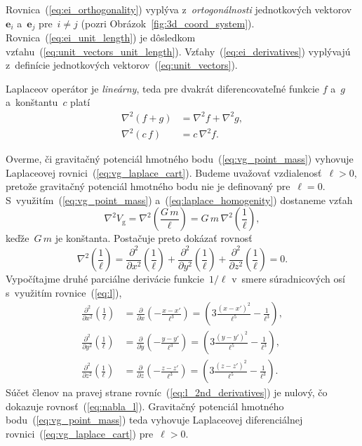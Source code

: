 \documentclass[a4paper, 12pt]{book}
\newcommand{\gidx}{\mathrm g}
\let\vec\mathbf
\begin{document}
%
Rovnica~(\ref{eq:ei_orthogonality}) vyplýva z~\emph{ortogonálnosti} 
jednotkových vektorov~$\vec e_i$ a~$\vec e_j$ pre~$i \neq j$ (pozri 
Obrázok~\ref{fig:3d_coord_system}).  Rovnica~(\ref{eq:ei_unit_length}) je 
dôsledkom vzťahu~(\ref{eq:unit_vectors_unit_length}).  
Vzťahy~(\ref{eq:ei_derivatives}) vyplývajú z~definície jednotkových 
vektorov~(\ref{eq:unit_vectors}).

Laplaceov operátor je \emph{lineárny}, teda pre dvakrát diferencovateľné 
funkcie $f$ a~$g$ a~konštantu~$c$ platí
%
\begin{align}
\label{eq:laplace_additivity}
\nabla^2 \left(f + g \right) &= \nabla^2 f + \nabla^2 g{,}\\
%
\label{eq:laplace_homogenity}
\nabla^2 (c \, f) &= c \, \nabla^2 f{.}
\end{align}

Overme, či gravitačný potenciál hmotného bodu~(\ref{eq:vg_point_mass}) vyhovuje 
Laplaceovej rovnici~(\ref{eq:vg_laplace_cart}).  Budeme uvažovať 
vzdialenosť~$\ell > 0$, pretože gravitačný potenciál hmotného bodu nie je 
definovaný pre~$\ell = 0$.  S~využitím~(\ref{eq:vg_point_mass}) 
a~(\ref{eq:laplace_homogenity}) dostaneme vzťah
%
\begin{equation}
\nabla^2 V_\gidx = \nabla^2 \left( \frac{G \, m}{\ell} \right) = G \, m \, 
\nabla^2 \left( \frac{1}{\ell} \right){,}
\end{equation}
%
keďže~$G \, m$ je konštanta.  Postačuje preto dokázať rovnosť
%
\begin{equation}
\label{eq:nabla_l}
\nabla^2 \left( \frac{1}{\ell} \right) = \frac{\partial^2}{\partial x^2}\left( 
\frac{1}{\ell} \right) + \frac{\partial^2}{\partial y^2}\left( \frac{1}{\ell} 
\right) + \frac{\partial^2}{\partial z^2}\left( \frac{1}{\ell} \right) = 0{.}
\end{equation}
%
Vypočítajme druhé parciálne derivácie funkcie~$1 \slash \ell$ v~smere 
súradnicových osí s~využitím rovnice~(\ref{eq:l}),
%
\begin{equation}
\label{eq:l_2nd_derivatives}
\begin{split}
\frac{\partial^2}{\partial x^2} \left( \frac{1}{\ell} \right) &=
\frac{\partial}{\partial x} \left( -\frac{x - x'}{\ell^3} \right) = \left(3
\frac{(x - x')^2}{\ell^5} - \frac{1}{\ell^3} \right){,}\\
%
\frac{\partial^2}{\partial y^2} \left( \frac{1}{\ell} \right) &=
\frac{\partial}{\partial y} \left( -\frac{y - y'}{\ell^3} \right) = \left(3
\frac{(y - y')^2}{\ell^5} - \frac{1}{\ell^3} \right){,}\\
%
\frac{\partial^2}{\partial z^2} \left( \frac{1}{\ell} \right) &=
\frac{\partial}{\partial z} \left( -\frac{z - z'}{\ell^3} \right) = \left(3
\frac{(z - z')^2}{\ell^5} - \frac{1}{\ell^3} \right){.}
\end{split}
\end{equation}
%
Súčet členov na pravej strane rovníc~(\ref{eq:l_2nd_derivatives}) je nulový, čo 
dokazuje rovnosť~(\ref{eq:nabla_l}).  Gravitačný potenciál hmotného 
bodu~(\ref{eq:vg_point_mass}) teda vyhovuje Laplaceovej diferenciálnej 
rovnici~(\ref{eq:vg_laplace_cart}) pre~$\ell > 0$.
\end{document}
